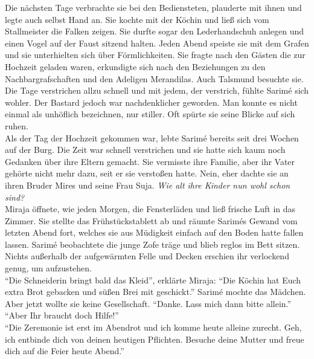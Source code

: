 Die nächsten Tage verbrachte sie bei den Bediensteten, plauderte mit ihnen und legte auch selbst 
Hand an. Sie kochte mit der Köchin und ließ sich vom Stallmeister die Falken zeigen. Sie durfte 
sogar den Lederhandschuh anlegen und einen Vogel auf der Faust sitzend halten. Jeden Abend speiste 
sie mit dem Grafen und sie unterhielten sich über Förmlichkeiten. Sie fragte nach den Gästen die 
zur Hochzeit geladen waren, erkundigte sich nach den Beziehungen zu den Nachbargrafschaften und den 
Adeligen Merandilas. Auch Talsmund besuchte sie. Die Tage verstrichen allzu schnell und mit jedem, 
der verstrich, fühlte Sarimé sich wohler. Der Bastard jedoch war nachdenklicher geworden. Man 
konnte es nicht einmal als unhöflich bezeichnen, nur stiller. Oft spürte sie seine Blicke auf sich 
ruhen.\\
Als der Tag der Hochzeit gekommen war, lebte Sarimé bereits seit drei Wochen auf der Burg. Die Zeit 
war schnell verstrichen und sie hatte sich kaum noch Gedanken über ihre Eltern gemacht. Sie 
vermisste ihre Familie, aber ihr Vater gehörte nicht mehr dazu, seit er sie verstoßen hatte. Nein, 
eher dachte sie an ihren Bruder Mires und seine Frau Suja. \textit{Wie alt ihre Kinder nun wohl 
schon sind?}\\
Miraja öffnete, wie jeden Morgen, die Fensterläden und ließ frische Luft in das Zimmer. Sie stellte 
das Frühstückstablett ab und räumte Sarimés Gewand vom letzten Abend fort, welches sie aus 
Müdigkeit einfach auf den Boden hatte fallen lassen. Sarimé beobachtete die junge Zofe träge und 
blieb reglos im Bett sitzen. Nichts außerhalb der aufgewärmten Felle und Decken erschien ihr 
verlockend genug, um aufzustehen.\\
``Die Schneiderin bringt bald das Kleid'', erklärte Miraja: ``Die Köchin hat Euch extra Brot 
gebacken und süßen Brei mit geschickt.''
Sarimé mochte das Mädchen. Aber jetzt wollte sie keine Gesellschaft. ``Danke. Lass mich dann 
bitte allein.''\\
``Aber Ihr braucht doch Hilfe!''\\
``Die Zeremonie ist erst im Abendrot und ich komme heute alleine zurecht. Geh, ich entbinde dich 
von deinen heutigen Pflichten. Besuche deine Mutter und freue dich auf die Feier heute Abend.''\\

